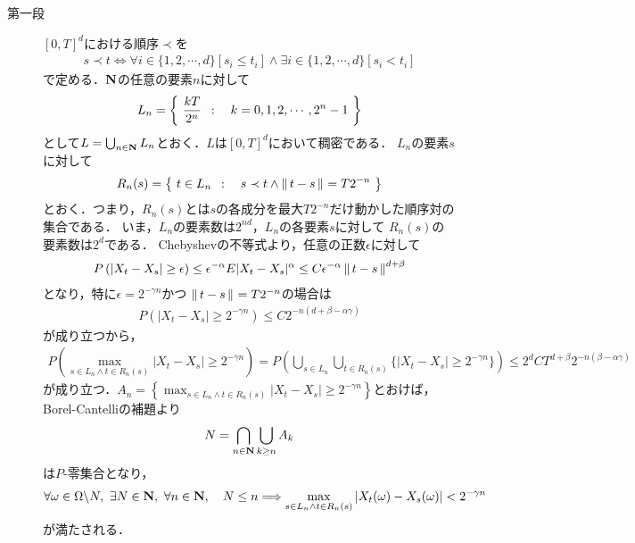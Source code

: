 	\begin{prf}\mbox{}
		\begin{description}
			\item[第一段]
				$[0,T]^d$における順序$\prec$を
				\begin{align}
					s \prec t \Longleftrightarrow \forall i \in \{1,2,\cdots,d\}[ s_i \leq t_i] \wedge \exists i \in \{1,2,\cdots,d\}[ s_i < t_i]
				\end{align}
				で定める．$\mathbf{N}$の任意の要素$n$に対して
				\begin{align}
					L_n = \left\{\ \frac{kT}{2^n}\ \, : \quad k=0,1,2,\cdots,2^n-1\ \right\}
				\end{align}
				として$L = \bigcup_{n \in \mathbf{N}} L_n$とおく．$L$は$[0,T]^d$において稠密である．
				$L_n$の要素$s$に対して
				\begin{align}
					R_n(s) = \left\{\ t \in L_n\ \, : \quad s \prec t \wedge \left\|\, t-s\, \right\|_{} = T2^{-n}\ \right\}
				\end{align}
				とおく．つまり，$R_n(s)$とは$s$の各成分を最大$T2^{-n}$だけ動かした順序対の集合である．
				いま，$L_n$の要素数は$2^{nd}$，$L_n$の各要素$s$に対して
				$R_n(s)$の要素数は$2^d$である．
				Chebyshevの不等式より，任意の正数$\epsilon$に対して
				\begin{align}
					P\left(|X_t-X_s|\geq\epsilon\right)
					\leq \epsilon^{-\alpha}E|X_t-X_s|^\alpha
					\leq C\epsilon^{-\alpha}\left\|\, t-s\, \right\|_{}^{d+\beta}
				\end{align}
				となり，特に$\epsilon = 2^{-\gamma n}$かつ
				$\left\|\, t-s\, \right\|_{} = T2^{-n}$の場合は
				\begin{align}
					P\left(|X_t-X_s|\geq2^{-\gamma n}\right)
					\leq C 2^{-n(d+\beta - \alpha \gamma)}
				\end{align}
				が成り立つから，
				\begin{align}
					P\left(\operatorname*{max}_{s \in L_n \wedge t \in R_n(s)}
					|X_t-X_s|\geq2^{-\gamma n}\right)
					= P\left(\bigcup_{s \in L_n} \bigcup_{t \in R_n(s)}
					\{|X_t-X_s|\geq2^{-\gamma n}\}\right)
					\leq 2^d C T^{d+\beta} 2^{-n(\beta - \alpha \gamma)}
				\end{align}
				が成り立つ．$A_n = \left\{\operatorname*{max}_{s \in L_n \wedge t \in R_n(s)}|X_t-X_s|\geq2^{-\gamma n}\right\}$とおけば，Borel-Cantelliの補題より
				\begin{align}
					N = \bigcap_{n \in \mathbf{N}} \bigcup_{k \geq n} A_k
				\end{align}
				は$P$-零集合となり，
				\begin{align}
					\forall \omega \in \Omega \backslash N,\
					\exists N \in \mathbf{N},\
					\forall n \in \mathbf{N},\quad
					N \leq n \Longrightarrow \operatorname*{max}_{s \in L_n \wedge t \in R_n(s)}
					|X_t(\omega) - X_s(\omega)| < 2^{-\gamma n}
					\label{eq:chapter_2_theorem_2_8_1}
				\end{align}
				が満たされる．
				

\end{description}
\end{prf}
